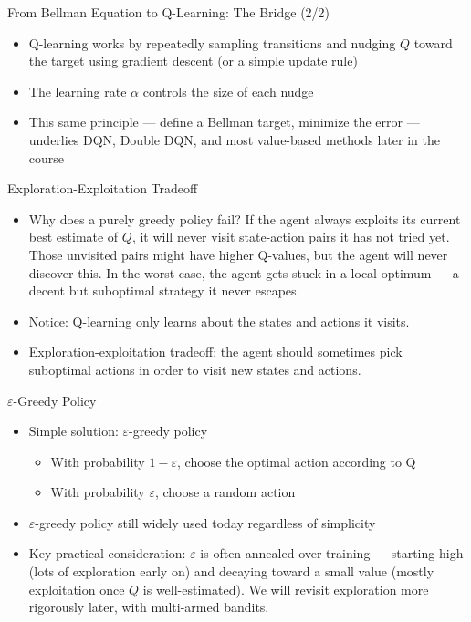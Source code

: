 \begin{frame}{From Bellman Equation to Q-Learning: The Bridge (2/2)}
\begin{itemize}
    \item Q-learning works by repeatedly sampling transitions and nudging $Q$ toward the target using gradient descent (or a simple update rule)
    \item The learning rate $\alpha$ controls the size of each nudge
    \item This same principle --- define a Bellman target, minimize the error --- underlies DQN, Double DQN, and most value-based methods later in the course
\end{itemize}
\end{frame}

\begin{frame}{Exploration-Exploitation Tradeoff}
\begin{itemize}
    \item Why does a purely greedy policy fail? If the agent always exploits its current best estimate of $Q$, it will never visit state-action pairs it has not tried yet. Those unvisited pairs might have higher Q-values, but the agent will never discover this. In the worst case, the agent gets stuck in a local optimum --- a decent but suboptimal strategy it never escapes.
    \item Notice: Q-learning only learns about the states and actions it visits.
    \item Exploration-exploitation tradeoff: the agent should sometimes pick suboptimal actions in order to visit new states and actions.
\end{itemize}
\end{frame}

\begin{frame}{$\varepsilon$-Greedy Policy}
\begin{itemize}
    \item Simple solution: $\varepsilon$-greedy policy
    \begin{itemize}
        \item With probability $1 - \varepsilon$, choose the optimal action according to Q
        \item With probability $\varepsilon$, choose a random action
    \end{itemize}
    \item $\varepsilon$-greedy policy still widely used today regardless of simplicity
    \item Key practical consideration: $\varepsilon$ is often annealed over training --- starting high (lots of exploration early on) and decaying toward a small value (mostly exploitation once $Q$ is well-estimated). We will revisit exploration more rigorously later, with multi-armed bandits.
\end{itemize}
\end{frame}

